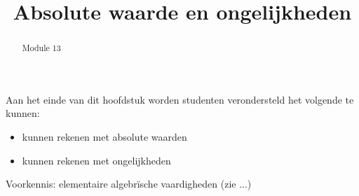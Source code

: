 \documentclass{ximera}
\title{Absolute waarde en ongelijkheden}
\begin{document}
\begin{abstract}
Module 13
\end{abstract}

\maketitle

\begin{sectionOutcomes}

Aan het einde van dit hoofdstuk worden studenten verondersteld het volgende te kunnen:

\begin{itemize}
\item kunnen rekenen met absolute waarden
\item kunnen rekenen met ongelijkheden 
\end{itemize}

Voorkennis: elementaire algebrïsche vaardigheden (zie ...)


\end{sectionOutcomes}
\end{document}
